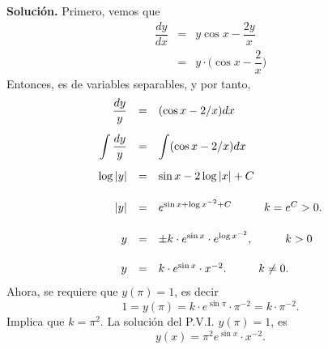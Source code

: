 \documentclass[10pt,a5paper]{article}
\begin{document}
\begin{enumerate}
		\textbf{Solución.} Primero, vemos que
		\[
			\begin{array}{rcl}
				\dfrac{dy}{dx} & = & y \cos x- \dfrac{2y}{x} \\[2mm]
				& = & y \cdot \Bigg(\cos x- \dfrac{2}{x}\Bigg)
			\end{array}
		\]
		Entonces, es de variables separables, y por tanto,
		\[
			\begin{array}{rcl}
				\dfrac{dy}{y} & = & (\cos x-2/x) dx \\[5mm]
				\displaystyle\int \dfrac{dy}{y} & = & \displaystyle\int (\cos x-2/x)dx \\[5mm]
				\log |y| & = & \sin x-2 \log |x|+C \\[5mm]
				|y| & = & e^{\sin x+\log x^{-2}+C} \hspace{1cm} k=e^C>0.\\[5mm]
				y & = & \pm k \cdot e^{\sin x} \cdot e^{\log x^{-2}}, \hspace{1cm} k>0\\[5mm]
				y & = & k \cdot e^{\sin x} \cdot x^{-2}. \hspace{1cm} k \ne 0.
			\end{array}
		\]
		Ahora, se requiere que \(y(\pi) =1\), es decir
		\[
			1 = y(\pi) = k \cdot e^{\sin \pi} \cdot \pi^{-2} = k \cdot \pi^{-2}.
		\]
		Implica que \(k=\pi^2\). La solución del P.V.I. \(y(\pi) =1\), es
		\[
			y(x) = \pi ^2 e^{\sin x} \cdot x^{-2}.
		\]
\end{enumerate}
\end{document}
